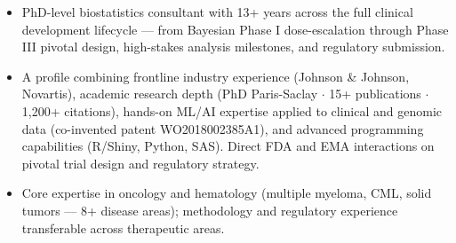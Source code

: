 \vspace*{.2em}
\begin{itemize}
\item[-] PhD-level biostatistics consultant with 13+ years across the full clinical development lifecycle --- from Bayesian Phase I dose-escalation through Phase III pivotal design, high-stakes analysis milestones, and regulatory submission.
\item[-] A profile combining frontline industry experience (Johnson \& Johnson, Novartis), academic research depth (PhD Paris-Saclay $\cdot$ 15+ publications $\cdot$ 1,200+ citations), hands-on ML/AI expertise applied to clinical and genomic data (co-invented patent WO2018002385A1), and advanced programming capabilities (R/Shiny, Python, SAS). Direct FDA and EMA interactions on pivotal trial design and regulatory strategy.
\item[-] Core expertise in oncology and hematology (multiple myeloma, CML, solid tumors --- 8+ disease areas); methodology and regulatory experience transferable across therapeutic areas.
\end{itemize}
